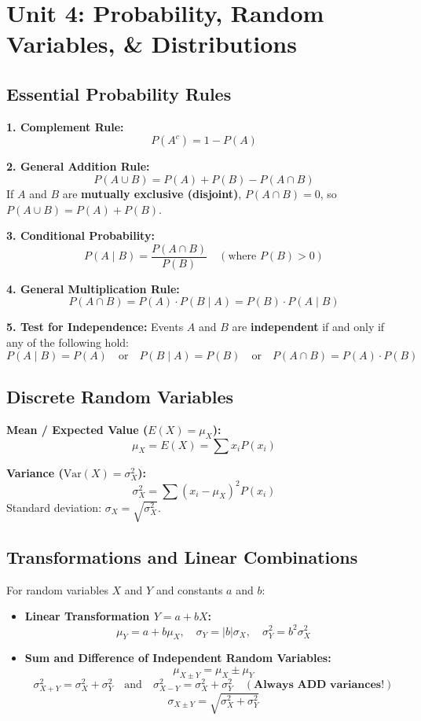 \chapter{Unit 4: Probability, Random Variables, \& Distributions}

\section{Essential Probability Rules}

\begin{formulabox}
\textbf{1. Complement Rule:}
\[
P(A^c) = 1 - P(A)
\]

\textbf{2. General Addition Rule:}
\[
P(A \cup B) = P(A) + P(B) - P(A \cap B)
\]
If $A$ and $B$ are \textbf{mutually exclusive (disjoint)}, $P(A \cap B) = 0$, so $P(A \cup B) = P(A) + P(B)$.

\textbf{3. Conditional Probability:}
\[
P(A \mid B) = \frac{P(A \cap B)}{P(B)} \quad (\text{where } P(B) > 0)
\]

\textbf{4. General Multiplication Rule:}
\[
P(A \cap B) = P(A) \cdot P(B \mid A) = P(B) \cdot P(A \mid B)
\]

\textbf{5. Test for Independence:}
Events $A$ and $B$ are \textbf{independent} if and only if any of the following hold:
\[
P(A \mid B) = P(A) \quad \text{or} \quad P(B \mid A) = P(B) \quad \text{or} \quad P(A \cap B) = P(A) \cdot P(B)
\]
\end{formulabox}

\section{Discrete Random Variables}

\begin{formulabox}
\textbf{Mean / Expected Value ($E(X) = \mu_X$):}
\[
\mu_X = E(X) = \sum x_i P(x_i)
\]

\textbf{Variance ($\text{Var}(X) = \sigma_X^2$):}
\[
\sigma_X^2 = \sum (x_i - \mu_X)^2 P(x_i)
\]
Standard deviation: $\sigma_X = \sqrt{\sigma_X^2}$.
\end{formulabox}

\section{Transformations and Linear Combinations}
For random variables $X$ and $Y$ and constants $a$ and $b$:
\begin{itemize}
    \item \textbf{Linear Transformation $Y = a + bX$:}
    \[
    \mu_Y = a + b\mu_X, \quad \sigma_Y = |b|\sigma_X, \quad \sigma_Y^2 = b^2 \sigma_X^2
    \]
    \item \textbf{Sum and Difference of Independent Random Variables:}
    \[
    \mu_{X \pm Y} = \mu_X \pm \mu_Y
    \]
    \[
    \sigma_{X+Y}^2 = \sigma_X^2 + \sigma_Y^2 \quad \text{and} \quad \sigma_{X-Y}^2 = \sigma_X^2 + \sigma_Y^2 \quad (\textbf{Always ADD variances!})
    \]
    \[
    \sigma_{X \pm Y} = \sqrt{\sigma_X^2 + \sigma_Y^2}
    \]
\end{itemize}

